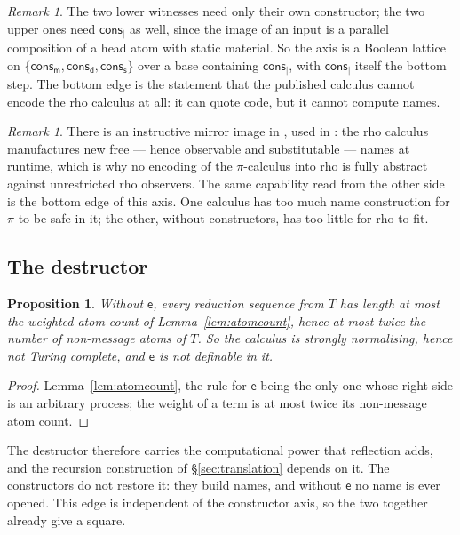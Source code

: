 \documentclass[11pt]{article}
\theoremstyle{plain}
\newtheorem{proposition}[theorem]{Proposition}
\theoremstyle{definition}
\theoremstyle{remark}
\newtheorem{remark}[theorem]{Remark}
\newcommand{\mm}{\mathsf{m}}
\newcommand{\dd}{\mathsf{d}}
\newcommand{\sy}{\mathsf{s}}
\newcommand{\ev}{\mathsf{e}}
\newcommand{\cons}{\mathsf{cons}}
\begin{document}
\begin{remark}
The two lower witnesses need only their own constructor; the two upper ones
need $\cons_{\mid}$ as well, since the image of an input is a parallel
composition of a head atom with static material. So the axis is a Boolean
lattice on $\{\cons_{\mm},\cons_{\dd},\cons_{\sy}\}$ over a base containing
$\cons_{\mid}$, with $\cons_{\mid}$ itself the bottom step. The bottom edge is
the statement that the published calculus cannot encode the rho calculus at
all: it can quote code, but it cannot compute names.
\end{remark}

\begin{remark}
There is an instructive mirror image in \cite{Lybech22}, used in
\cite{nowns}: the rho calculus manufactures new free --- hence observable and
substitutable --- names at runtime, which is why no encoding of the
$\pi$-calculus into rho is fully abstract against unrestricted rho observers.
The same capability read from the other side is the bottom edge of this axis.
One calculus has too much name construction for $\pi$ to be safe in it; the
other, without constructors, has too little for rho to fit.
\end{remark}

\subsection{The destructor}

\begin{proposition}
\label{prop:sn}
Without $\ev$, every reduction sequence from $T$ has length at most the
weighted atom count of Lemma~\ref{lem:atomcount}, hence at most twice the
number of non-message atoms of $T$. So the calculus is strongly normalising,
hence not Turing complete, and $\ev$ is not definable in it.
\end{proposition}

\begin{proof}
Lemma~\ref{lem:atomcount}, the rule for $\ev$ being the only one whose right
side is an arbitrary process; the weight of a term is at most twice its
non-message atom count.
\end{proof}

The destructor therefore carries the computational power that reflection
adds, and the recursion construction of \S\ref{sec:translation} depends on
it. The constructors do not restore it: they build names, and without $\ev$
no name is ever opened. This edge is independent of the constructor axis, so
the two together already give a square.
\end{document}
